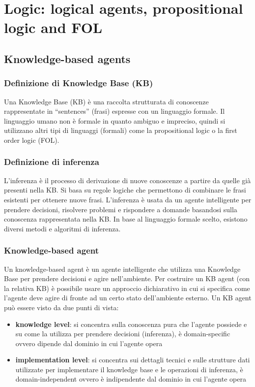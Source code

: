 \section{Logic: logical agents, propositional logic and FOL}
\subsection{Knowledge-based agents}
\subsubsection*{Definizione di Knowledge Base (KB)}
Una Knowledge Base (KB) è una raccolta strutturata di conoscenze rappresentate in ``sentences'' (frasi) espresse con un 
linguaggio formale. Il linguaggio umano non è formale in quanto ambiguo e impreciso, quindi si utilizzano altri tipi di
linguaggi (formali) come la propositional logic o la first order logic (FOL).

\subsubsection*{Definizione di inferenza}
L'inferenza è il processo di derivazione di nuove conoscenze a partire da quelle già presenti nella KB. Si basa su regole logiche
che permettono di combinare le frasi esistenti per ottenere nuove frasi. L'inferenza è usata da un agente intelligente per prendere
decisioni, risolvere problemi e rispondere a domande basandosi sulla conoscenza rappresentata nella KB. In base al linguaggio
formale scelto, esistono diversi metodi e algoritmi di inferenza.

\subsubsection*{Knowledge-based agent}
Un knowledge-based agent è un agente intelligente che utilizza una Knowledge Base per prendere decisioni e agire nell'ambiente.
Per costruire un KB agent (con la relativa KB) è possibile usare un approccio dichiarativo in cui si specifica come l'agente
deve agire di fronte ad un certo stato dell'ambiente esterno. Un KB agent può essere visto da due punti di vista:
\begin{itemize}
	\item \textbf{knowledge level}: si concentra sulla conoscenza pura che l'agente possiede e su come la utilizza per prendere
	decisioni (inferenza), è domain-specific ovvero dipende dal dominio in cui l'agente opera
	\item \textbf{implementation level}: si concentra sui dettagli tecnici e sulle strutture dati utilizzate per implementare
	il knowledge base e le operazioni di inferenza, è domain-independent ovvero è indipendente dal dominio in cui l'agente opera
\end{itemize}

